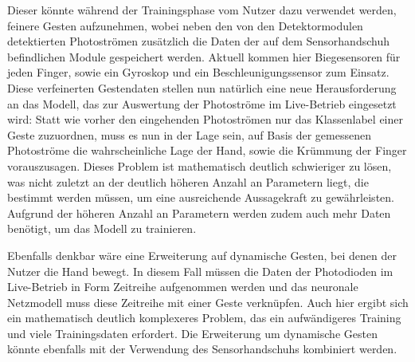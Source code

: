 Dieser könnte während der Trainingsphase vom Nutzer dazu verwendet werden, feinere Gesten aufzunehmen, wobei neben den von den Detektormodulen detektierten Photoströmen zusätzlich die Daten der auf dem Sensorhandschuh befindlichen Module gespeichert werden. Aktuell kommen hier Biegesensoren für jeden Finger, sowie ein Gyroskop und ein Beschleunigungssensor zum Einsatz. Diese verfeinerten Gestendaten stellen nun natürlich eine neue Herausforderung an das Modell, das zur Auswertung der Photoströme im Live-Betrieb eingesetzt wird: Statt wie vorher den eingehenden Photoströmen nur das Klassenlabel einer Geste zuzuordnen, muss es nun in der Lage sein, auf Basis der gemessenen Photoströme die wahrscheinliche Lage der Hand, sowie die Krümmung der Finger vorauszusagen. Dieses Problem ist mathematisch deutlich schwieriger zu lösen, was nicht zuletzt an der deutlich höheren Anzahl an Parametern liegt, die bestimmt werden müssen, um eine ausreichende Aussagekraft zu gewährleisten. Aufgrund der höheren Anzahl an Parametern werden zudem auch mehr Daten benötigt, um das Modell zu trainieren.

Ebenfalls denkbar wäre eine Erweiterung auf dynamische Gesten, bei denen der Nutzer die Hand bewegt. In diesem Fall müssen die Daten der Photodioden im Live-Betrieb in Form Zeitreihe aufgenommen werden und das neuronale Netzmodell muss diese Zeitreihe mit einer Geste verknüpfen. Auch hier ergibt sich ein mathematisch deutlich komplexeres Problem, das ein aufwändigeres Training und viele Trainingsdaten erfordert. Die Erweiterung um dynamische Gesten könnte ebenfalls mit der Verwendung des Sensorhandschuhs kombiniert werden.

